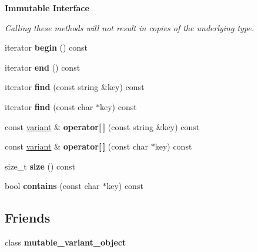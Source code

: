 \begin{Indent}\textbf{ Immutable Interface}\par
{\em Calling these methods will not result in copies of the underlying type. }\begin{DoxyCompactItemize}
\item 
\mbox{\label{classfc_1_1variant__object_ae0b10525c519de4e4ea077505cb09ac8}} 
iterator {\bfseries begin} () const
\item 
\mbox{\label{classfc_1_1variant__object_a804706455398e249f6272b3ff19cef5d}} 
iterator {\bfseries end} () const
\item 
\mbox{\label{classfc_1_1variant__object_acfef67913fd3c24ea8017b3a5ad49144}} 
iterator {\bfseries find} (const string \&key) const
\item 
\mbox{\label{classfc_1_1variant__object_ac20032bbbaa2b452c02c9cb70c92d2af}} 
iterator {\bfseries find} (const char $\ast$key) const
\item 
\mbox{\label{classfc_1_1variant__object_a1eaacba2c397b848553efaa616e3b58f}} 
const \mbox{\hyperlink{classfc_1_1variant}{variant}} \& {\bfseries operator\mbox{[}$\,$\mbox{]}} (const string \&key) const
\item 
\mbox{\label{classfc_1_1variant__object_ac1ce4210cfe70480c944fcb98bc9deb8}} 
const \mbox{\hyperlink{classfc_1_1variant}{variant}} \& {\bfseries operator\mbox{[}$\,$\mbox{]}} (const char $\ast$key) const
\item 
\mbox{\label{classfc_1_1variant__object_a0e523ff3ad212b0582ad2ac8a07773ae}} 
size\+\_\+t {\bfseries size} () const
\item 
\mbox{\label{classfc_1_1variant__object_ae4ed31b7cb6bc6e1d2873f9121049589}} 
bool {\bfseries contains} (const char $\ast$key) const
\end{DoxyCompactItemize}
\end{Indent}
\subsection*{Friends}
\begin{DoxyCompactItemize}
\item 
\mbox{\label{classfc_1_1variant__object_a8bc4fdcd652f006622ab45f1dfb948b7}} 
class {\bfseries mutable\+\_\+variant\+\_\+object}
\end{DoxyCompactItemize}



